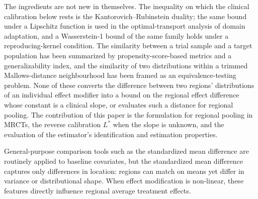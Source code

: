 \documentclass[AMA,Times1COL]{WileyNJDv5}
\begin{document}
The ingredients are not new in themselves. The inequality on which the clinical calibration below rests is the Kantorovich--Rubinstein duality; the same bound under a Lipschitz function is used in the optimal-transport analysis of domain adaptation,\cite{shen2018} and a Wasserstein-1 bound of the same family holds under a reproducing-kernel condition.\cite{redko2017} The similarity between a trial sample and a target population has been summarized by propensity-score-based metrics\cite{stuart2011} and a generalizability index,\cite{tipton2014} and the similarity of two distributions within a trimmed Mallows-distance neighbourhood has been framed as an equivalence-testing problem.\cite{munk1998} None of these converts the difference between two regions' distributions of an individual effect modifier into a bound on the regional effect difference whose constant is a clinical slope, or evaluates such a distance for regional pooling. The contribution of this paper is the formulation for regional pooling in MRCTs, the reverse calibration $L^*$ when the slope is unknown, and the evaluation of the estimator's identification and estimation properties.


General-purpose comparison tools such as the standardized mean difference are routinely applied to baseline covariates,\cite{austin2011} but the standardized mean difference captures only differences in location: regions can match on means yet differ in variance or distributional shape. When effect modification is non-linear, these features directly influence regional average treatment effects.
\end{document}
